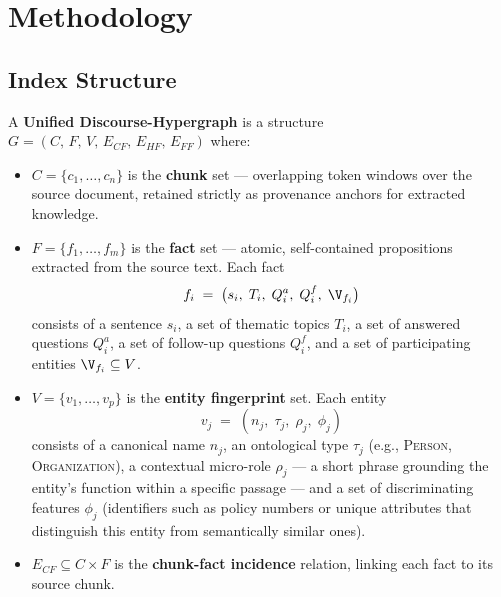 \documentclass[runningheads]{llncs}
\begin{document}
\section{Methodology}
 
\subsection{Index Structure}
 
\begin{definition}
A \textbf{Unified Discourse-Hypergraph} is a structure
$G = (C,\, F,\, V,\, E_{CF},\, E_{HF},\, E_{FF})$ where:
 
\begin{itemize}
  \item $C = \{c_1, \ldots, c_n\}$ is the \textbf{chunk} set --- overlapping
        token windows over the source document, retained strictly as provenance
        anchors for extracted knowledge.
 
  \item $F = \{f_1, \ldots, f_m\}$ is the \textbf{fact} set --- atomic,
        self-contained propositions extracted from the source text. Each fact
        \[
          f_i \;=\; \bigl(s_i,\; T_i,\; Q_i^a,\; Q_i^f,\; \V_{f_i}\bigr)
        \]
        consists of a sentence $s_i$, a set of thematic topics $T_i$, a set of
        answered questions $Q_i^a$, a set of follow-up questions $Q_i^f$, and a
        set of participating entities $\V_{f_i} \subseteq V$.
 
  \item $V = \{v_1, \ldots, v_p\}$ is the \textbf{entity fingerprint} set.
        Each entity
        \[
          v_j \;=\; (n_j,\; \tau_j,\; \rho_j,\; \phi_j)
        \]
        consists of a canonical name $n_j$, an ontological type $\tau_j$
        (e.g., \textsc{Person}, \textsc{Organization}), a contextual
        micro-role $\rho_j$ --- a short phrase grounding the entity's function
        within a specific passage --- and a set of discriminating features
        $\phi_j$ (identifiers such as policy numbers or unique attributes that
        distinguish this entity from semantically similar ones).
 
  \item $E_{CF} \subseteq C \times F$ is the \textbf{chunk-fact incidence}
        relation, linking each fact to its source chunk.
 

\end{itemize}
\end{definition}
\end{document}
